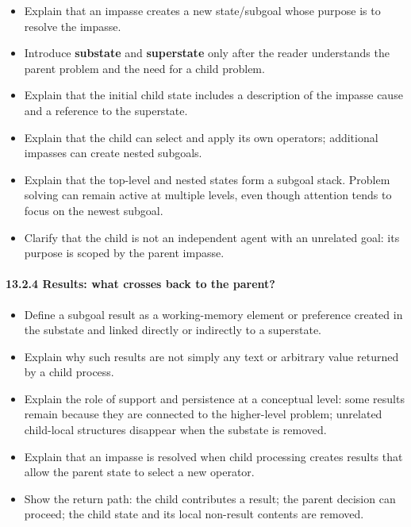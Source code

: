 \begin{itemize}
\tightlist
\item
  Explain that an impasse creates a new state/subgoal whose purpose is to resolve the impasse.
\item
  Introduce \textbf{substate} and \textbf{superstate} only after the reader understands the parent problem and the need for a child problem.
\item
  Explain that the initial child state includes a description of the impasse cause and a reference to the superstate.
\item
  Explain that the child can select and apply its own operators; additional impasses can create nested subgoals.
\item
  Explain that the top-level and nested states form a subgoal stack. Problem solving can remain active at multiple levels, even though attention tends to focus on the newest subgoal.
\item
  Clarify that the child is not an independent agent with an unrelated goal: its purpose is scoped by the parent impasse.
\end{itemize}

\paragraph{13.2.4 Results: what crosses back to the parent?}\label{results-what-crosses-back-to-the-parent}

\begin{itemize}
\tightlist
\item
  Define a subgoal result as a working-memory element or preference created in the substate and linked directly or indirectly to a superstate.
\item
  Explain why such results are not simply any text or arbitrary value returned by a child process.
\item
  Explain the role of support and persistence at a conceptual level: some results remain because they are connected to the higher-level problem; unrelated child-local structures disappear when the substate is removed.
\item
  Explain that an impasse is resolved when child processing creates results that allow the parent state to select a new operator.
\item
  Show the return path: the child contributes a result; the parent decision can proceed; the child state and its local non-result contents are removed.
\end{itemize}

